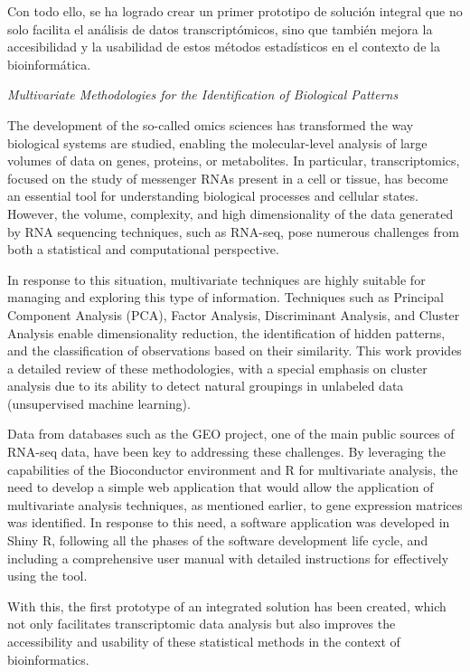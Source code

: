 Con todo ello, se ha logrado crear un primer prototipo de solución integral que no solo facilita el análisis de datos transcriptómicos, sino que también 
mejora la accesibilidad y la usabilidad de estos métodos estadísticos en el contexto de la bioinformática.


\noindent

\newpage

\begin{center}
    \emph{Multivariate Methodologies for the Identification of Biological Patterns}
    \end{center}
    \vspace{1cm}

    The development of the so-called omics sciences has transformed the way biological systems are studied, enabling the molecular-level analysis of large volumes 
    of data on genes, proteins, or metabolites. In particular, transcriptomics, focused on the study of messenger RNAs present in a cell or tissue, has become an 
    essential tool for understanding biological processes and cellular states. However, the volume, complexity, and high dimensionality of the data generated by RNA 
    sequencing techniques, such as RNA-seq, pose numerous challenges from both a statistical and computational perspective. \newline

    In response to this situation, multivariate techniques are highly suitable for managing and exploring this type of information. Techniques such as Principal 
    Component Analysis (PCA), Factor Analysis, Discriminant Analysis, and Cluster Analysis enable dimensionality reduction, the identification of hidden patterns, 
    and the classification of observations based on their similarity. This work provides a detailed review of these methodologies, with a special emphasis on cluster 
    analysis due to its ability to detect natural groupings in unlabeled data (unsupervised machine learning). \newline

    Data from databases such as the GEO project, one of the main public sources of RNA-seq data, have been key to addressing these challenges. By leveraging the 
    capabilities of the Bioconductor environment and R for multivariate analysis, the need to develop a simple web application that would allow the application of 
    multivariate analysis techniques, as mentioned earlier, to gene expression matrices was identified. In response to this need, a software application was developed 
    in Shiny R, following all the phases of the software development life cycle, and including a comprehensive user manual with detailed instructions for effectively 
    using the tool. \newline

    With this, the first prototype of an integrated solution has been created, which not only facilitates transcriptomic data analysis but also improves the 
    accessibility and usability of these statistical methods in the context of bioinformatics.
    
\endinput
